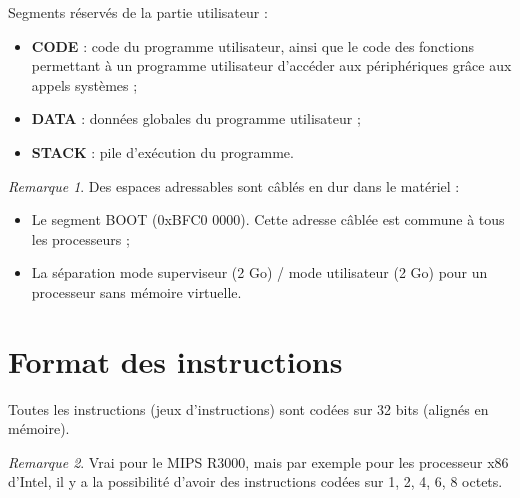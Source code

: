 \documentclass[11pt,english,french]{scrreprt}
\theoremstyle{remark}
\newtheorem*{rem*}{Remarque}
\theoremstyle{definition}
\begin{document}
\vspace{10pt}

Segments réservés de la partie utilisateur :\begin{itemize}
	\item \textbf{CODE} : code du programme utilisateur, ainsi que le code des fonctions permettant à un programme utilisateur d'accéder aux périphériques grâce aux appels systèmes ;
	\item \textbf{DATA} : données globales du programme utilisateur ;
	\item \textbf{STACK} : pile d'exécution du programme.
\end{itemize}


\begin{rem*}
	Des espaces adressables sont câblés en dur dans le matériel :\begin{itemize}
		\item Le segment BOOT (0xBFC0 0000). Cette adresse câblée est commune à tous les processeurs ;
		\item La séparation mode superviseur (2 Go) / mode utilisateur (2 Go) pour un processeur sans mémoire virtuelle.
	\end{itemize}
\end{rem*}

\section{Format des instructions} %

Toutes les instructions (jeux d'instructions) sont codées sur 32 bits (alignés en mémoire).

\begin{rem*}
	Vrai pour le MIPS R3000, mais par exemple pour les processeur x86 d'Intel, il y a la possibilité d'avoir des instructions codées sur 1, 2, 4, 6, 8 octets.
\end{rem*}
\end{document}
